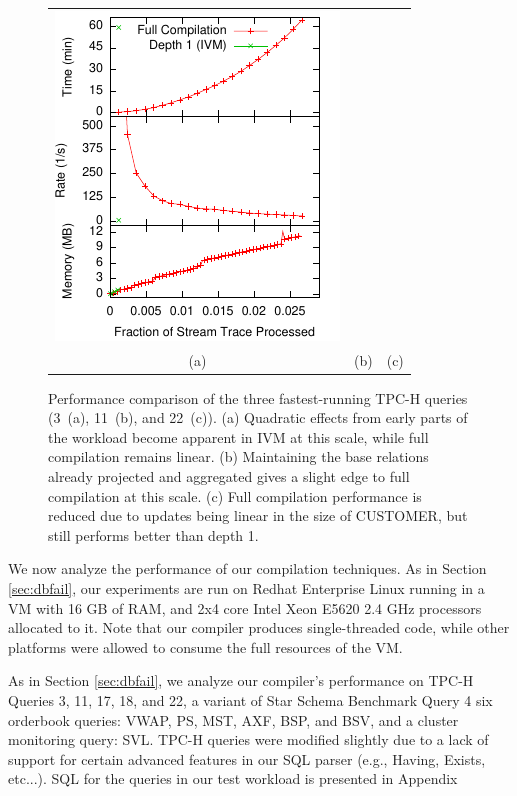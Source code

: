 \begin{figure}
\begin{center}
\begin{minipage}{\textwidth}
\begin{center}
\begin{tabular}{ccc}
\includegraphics[width=\figurewidth]{../graphs/graphs/unified_5gig_tpch22.pdf} \\
(a) & (b) & (c)
\end{tabular}
\caption{Performance comparison of the three fastest-running TPC-H queries (3~(a), 11~(b), and 22~(c)).  (a) Quadratic effects from early parts of the workload become apparent in IVM at this scale, while full compilation remains linear. (b) Maintaining the base relations already projected and aggregated gives a slight edge to full compilation at this scale.  (c) Full compilation performance is reduced due to updates being linear in the size of CUSTOMER, but still performs better than depth 1.}
\label{fig:experiments:big}
\label{fig:experiments:big:tpch3}
\label{fig:experiments:big:tpch11}
\label{fig:experiments:big:tpch22}
\end{center}
\end{minipage}

\end{center}
\end{figure}

We now analyze the performance of our compilation techniques.  As in Section \ref{sec:dbfail}, our experiments are run on Redhat Enterprise Linux running in a VM with 16 GB of RAM, and 2x4 core Intel Xeon E5620 2.4 GHz processors allocated to it.  Note that our compiler produces single-threaded code, while other platforms were allowed to consume the full resources of the VM.

As in Section \ref{sec:dbfail}, we analyze our compiler's performance on TPC-H\cite{tpch} Queries 3, 11, 17, 18, and 22, a variant of Star Schema Benchmark\cite{ssb} Query 4 six orderbook queries: VWAP, PS, MST, AXF, BSP, and BSV, and a cluster monitoring query: SVL.  TPC-H queries were modified slightly due to a lack of support for certain advanced features in our SQL parser (e.g., Having, Exists, etc...).  SQL for the queries in our test workload is presented in Appendix




